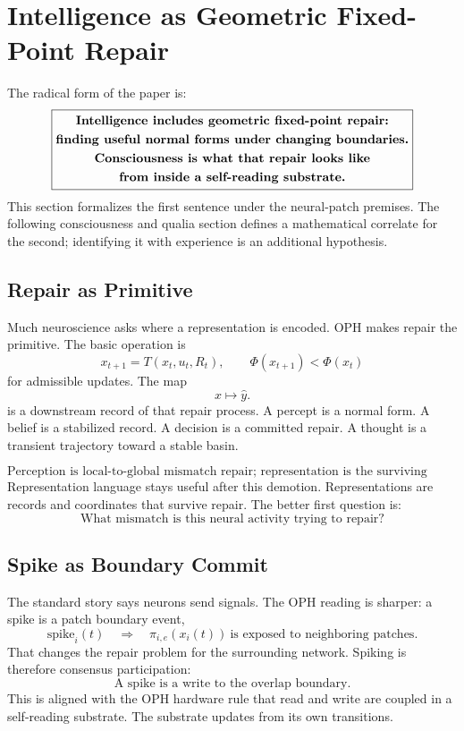 \documentclass[11pt]{article}
\theoremstyle{remark}
\theoremstyle{plain}
\begin{document}
\section{Intelligence as Geometric Fixed-Point Repair}

The radical form of the paper is:
\[
\boxed{
\begin{gathered}
\text{\bfseries Intelligence includes geometric fixed-point repair:}\\
\text{\bfseries finding useful normal forms under changing boundaries.}\\
\text{\bfseries Consciousness is what that repair looks like}\\
\text{\bfseries from inside a self-reading substrate.}
\end{gathered}
}
\]
This section formalizes the first sentence under the neural-patch premises.
The following consciousness and qualia section defines a mathematical correlate
for the second; identifying it with experience is an additional hypothesis.

\subsection{Repair as Primitive}

Much neuroscience asks where a representation is encoded. OPH makes repair the primitive. The basic operation is
\[
x_{t+1}=T(x_t,u_t,R_t),
\qquad
\Phi(x_{t+1})<\Phi(x_t)
\]
for admissible updates. The map
\[
x\mapsto \hat y.
\]
is a downstream record of that repair process. A percept is a normal form. A belief is a stabilized record. A decision is a committed repair. A thought is a transient trajectory toward a stable basin.

\[
\boxed{
\text{Perception is local-to-global mismatch repair; representation is the surviving record.}
}
\]
Representation language stays useful after this demotion. Representations are records and coordinates that survive repair. The better first question is:
\[
\boxed{
\text{What mismatch is this neural activity trying to repair?}
}
\]

\subsection{Spike as Boundary Commit}

The standard story says neurons send signals. The OPH reading is sharper: a spike is a patch boundary event,
\[
\mathrm{spike}_i(t)
\quad\Longrightarrow\quad
\pi_{i,e}(x_i(t))\ \text{is exposed to neighboring patches}.
\]
That changes the repair problem for the surrounding network. Spiking is therefore consensus participation:
\[
\boxed{
\text{A spike is a write to the overlap boundary.}
}
\]
This is aligned with the OPH hardware rule that read and write are coupled in a self-reading substrate. The substrate updates from its own transitions.
\end{document}
